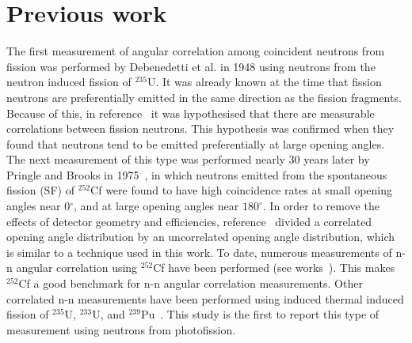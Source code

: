 \section{Previous work}
The first measurement of angular correlation among coincident neutrons from fission was performed by Debenedetti et al. \cite{1948twoNCorr} in 1948 using neutrons from the neutron induced fission of $^{235}\text{U}$.
It was already known at the time that fission neutrons are preferentially emitted in the same direction as the fission fragments.
Because of this, in reference~\cite{1948twoNCorr} it was hypothesised that there are measurable correlations between fission neutrons.
This hypothesis was confirmed when they found that neutrons tend to be emitted preferentially at large opening angles.
The next measurement of this type was performed nearly 30 years later by Pringle and Brooks in 1975~\cite{1975Cf252}, in which neutrons emitted from the spontaneous fission (SF) of $^{252}$Cf were found to have high coincidence rates at small opening angles near 0$^{\circ}$, and at large opening angles near $180^{\circ}$.
In order to remove the effects of detector geometry and efficiencies, reference~\cite{1975Cf252} divided a correlated opening angle distribution by an uncorrelated opening angle distribution, which is similar to a technique used in this work.
To date, numerous measurements of n-n angular correlation using $^{252}$Cf have been performed (see works~\cite{1975Cf252, 2008CF252, Pozzi2014}).
This makes $^{252}$Cf a good benchmark for n-n angular correlation measurements.
Other correlated n-n measurements have been performed using induced thermal induced fission of $^{235}$U, $^{233}$U, and $^{239}$Pu~\cite{Sokolov2010}.
This study is the first to report this type of measurement using neutrons from photofission.



